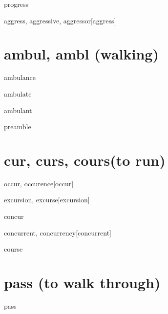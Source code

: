 \begin{wordRef}{progress}
\end{wordRef}

\begin{wordRef}{aggress, aggressive, aggressor}[aggress]
\end{wordRef}

\section{ambul, ambl (walking)}
\begin{wordRef}{ambulance}
\end{wordRef}

\begin{wordRef}{ambulate}
\end{wordRef}

\begin{wordRef}{ambulant}
\end{wordRef}

\begin{wordRef}{preamble}
\end{wordRef}

\section{cur, curs, cours(to run)}

\begin{wordRef}{occur, occurence}[occur]
\end{wordRef}

\begin{wordRef}{excursion, excurse}[excursion]
\end{wordRef}


\begin{wordRef}{concur}
    
\end{wordRef}

\begin{wordRef}{concurrent, concurrency}[concurrent]
\end{wordRef}

\begin{wordRef}{course}
\end{wordRef}

\section{pass (to walk through)}

\begin{wordRef}{pass}
\end{wordRef}

